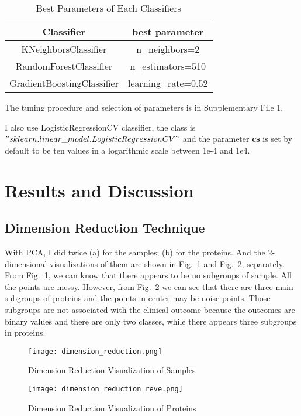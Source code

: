 \documentclass{article}
\begin{document}
 \begin{table}[h!]
 \centering
 \caption{Best Parameters of Each Classifiers}
 \label{best_para}
\begin{tabular}{  | c | c |   }


\hline
Classifier & best parameter  \\
\hline
KNeighborsClassifier & n\_neighbors=2 \\
\hline
RandomForestClassifier & n\_estimators=510 \\
\hline
GradientBoostingClassifier & learning\_rate=0.52 \\
\hline
 \end{tabular}
\end{table}

The tuning procedure and selection of parameters is in Supplementary File 1. 

I also use LogisticRegressionCV classifier\cite{schmidt2017minimizing}, the class is $"sklearn.linear\_model.LogisticRegressionCV"$ and the parameter \textbf{cs} is set by default to be ten values in a logarithmic scale between 1e-4 and 1e4. 


\section{Results and Discussion}
\subsection{Dimension Reduction Technique }
With PCA, I did twice (a) for the samples; (b) for the proteins. And the 2-dimensional visualizations of them are shown in Fig.~\ref{sample_v} and Fig.~\ref{protein_v}, separately. From Fig.~\ref{sample_v}, we can know that there appears to be no subgroups of sample. All the points are messy. However, from Fig.~\ref{protein_v} we can see that there are three main subgroups of proteins and the points in center may be noise points. Those subgroups are not associated with the clinical outcome because the outcomes are binary values and there are only two classes, while there appears three subgroups in proteins.

\begin{figure}[h]
    		\texttt{[image: dimension\_reduction.png]}
		\centering
		\caption{Dimension Reduction Visualization of Samples }
		\label{sample_v}
    		\end{figure}
		
\begin{figure}[h]
    		\texttt{[image: dimension\_reduction\_reve.png]}
		\centering
		\caption{Dimension Reduction Visualization of Proteins }
		\label{protein_v}
    		\end{figure}
\end{document}
